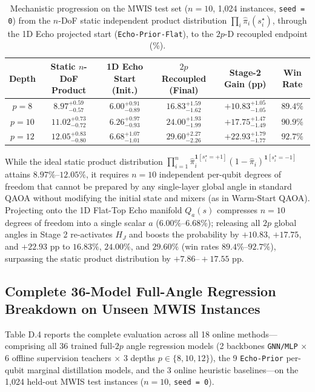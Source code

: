 \documentclass{article}
\theoremstyle{plain}
\theoremstyle{definition}
\begin{document}
\begin{table}[htbp]
\vskip -0.04in
\caption{Mechanistic progression on the MWIS test set ($n=10$, 1,024 instances, \texttt{seed = 0}) from the $n$-DoF static independent product distribution $\prod_i\widehat\pi_i(s_i^\star)$, through the 1D Echo projected start (\texttt{Echo-Prior-Flat}), to the $2p$-D recoupled endpoint (\%).}
\label{tab:d_3}
\vskip 0.01in
\centering
\footnotesize
\renewcommand{\arraystretch}{0.96}
\setlength{\tabcolsep}{5.5pt}
\begin{tabular}{cccccc}
\toprule
Depth & Static $n$-DoF Product & 1D Echo Start (Init.) & $2p$ Recoupled (Final) & Stage-2 Gain (pp) & Win Rate \\
\midrule
$p = 8$ & $8.97^{+0.59}_{-0.57}$ & $6.00^{+0.91}_{-0.89}$ & $\mathbf{16.83}^{+1.59}_{-1.62}$ & $+10.83^{+1.05}_{-1.05}$ & $89.4\%$ \\
$p = 10$ & $11.02^{+0.73}_{-0.72}$ & $6.26^{+0.97}_{-0.93}$ & $\mathbf{24.00}^{+1.93}_{-1.99}$ & $+17.75^{+1.47}_{-1.49}$ & $90.9\%$ \\
$p = 12$ & $12.05^{+0.83}_{-0.80}$ & $6.68^{+1.07}_{-1.01}$ & $\mathbf{29.60}^{+2.27}_{-2.26}$ & $+22.93^{+1.79}_{-1.77}$ & $92.7\%$ \\
\bottomrule
\end{tabular}%
\vskip -0.02in
\end{table}
While the ideal static product distribution $\prod_{i=1}^n\widehat\pi_i^{\mathbf1[s_i^\star=+1]}(1-\widehat\pi_i)^{\mathbf1[s_i^\star=-1]}$ attains $8.97\%\text{--}12.05\%$, it requires $n=10$ independent per-qubit degrees of freedom that cannot be prepared by any single-layer global angle in standard QAOA without modifying the initial state and mixers (as in Warm-Start QAOA). Projecting onto the 1D Flat-Top Echo manifold $Q_a(s)$ compresses $n=10$ degrees of freedom into a single scalar $a$ ($6.00\%\text{--}6.68\%$); releasing all $2p$ global angles in Stage 2 re-activates $H_J$ and boosts the probability by $+10.83$, $+17.75$, and $+22.93$ pp to $\mathbf{16.83}\%$, $\mathbf{24.00}\%$, and $\mathbf{29.60}\%$ (win rates $89.4\%\text{--}92.7\%$), surpassing the static product distribution by $+7.86\text{--}+17.55$ pp.

\subsection{Complete 36-Model Full-Angle Regression Breakdown on Unseen MWIS Instances}\label{subsec:d_3}

Table D.4 reports the complete evaluation across all 18 online methods---comprising all 36 trained full-$2p$ angle regression models (2 backbones \texttt{GNN/\allowbreak{}MLP} $\times$ 6 offline supervision teachers $\times$ 3 depths $p\in\{8,10,12\}$), the 9 \texttt{Echo-Prior} per-qubit marginal distillation models, and the 3 online heuristic baselines---on the 1,024 held-out MWIS test instances ($n=10$, \texttt{seed = 0}).
\end{document}
